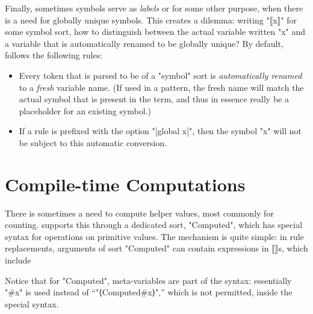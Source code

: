 \documentclass[11pt]{article} %
\begin{document}
Finally, sometimes symbols serve as \emph{labels} or for some other purpose, when there is a need
for globally unique symbols. This creates a dilemma: writing "⟦x⟧" for some symbol sort, how to
distinguish between the actual variable written "x" and a variable that is automatically renamed to
be globally unique? By default, \HAX follows the following rules:
\begin{itemize}

\item Every token that is parsed to be of a "symbol" sort is \emph{automatically renamed} to a
  \emph{fresh} variable name. (If used in a pattern, the fresh name will match the actual symbol
  that is present in the term, and thus in essence really be a placeholder for an existing symbol.)

\item If a rule is prefixed with the option "[global x]", then the symbol "x" will not be subject to
  this automatic conversion.

\end{itemize}


\section{Compile-time Computations}
\label{sec:comp}

There is sometimes a need to compute helper values, most commonly for counting. \HAX supports this
through a dedicated sort, "Computed", which has special syntax for operations on primitive values.
The mechanism is quite simple: in rule replacements, arguments of sort "Computed" can contain
expressions in ⟦⟧s, which include
Notice that for "Computed", meta-variables are part of the syntax: essentially "#x" is used instead
of ``"⟨Computed#x⟩",'' which is not permitted, inside the special syntax.
\end{document}

